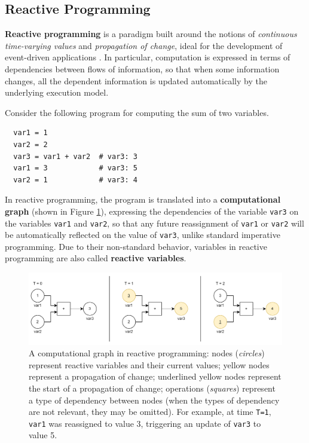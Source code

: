 
\subsection{Reactive Programming}
\label{section:background:concepts:reactive-programming}

\textbf{Reactive programming} is a paradigm built around the notions of
\textit{continuous time-varying values} and \textit{propagation of change},
ideal for the development of event-driven applications
\cite{ReactiveProgramming}. In particular, computation is expressed in terms of
dependencies between flows of information, so that when some information
changes, all the dependent information is updated automatically by the
underlying execution model.

Consider the following program for computing the sum of two variables.

\begin{lstlisting}
  var1 = 1
  var2 = 2
  var3 = var1 + var2  # var3: 3
  var1 = 3            # var3: 5
  var2 = 1            # var3: 4
\end{lstlisting}

In reactive programming, the program is translated into a \textbf{computational
graph} (shown in Figure \ref{figure:dependency-graph}), expressing the
dependencies of the variable \texttt{var3} on the variables \texttt{var1} and
\texttt{var2}, so that any future reassignment of \texttt{var1} or
\texttt{var2} will be automatically reflected on the value of \texttt{var3},
unlike standard imperative programming. Due to their non-standard behavior,
variables in reactive programming are also called \textbf{reactive variables}.

\begin{figure}[!ht]
  \centering
  \includegraphics[width=\textwidth]{resources/figures/dependency-graph.png}
  \caption[A computational graph in reactive programming]{
    A computational graph in reactive programming: nodes (\textit{circles})
    represent reactive variables and their current values; yellow nodes
    represent a propagation of change; underlined yellow nodes represent the
    start of a propagation of change; operations (\textit{squares}) represent a
    type of dependency between nodes (when the types of dependency are not
    relevant, they may be omitted). For example, at time \texttt{T=1},
    \texttt{var1} was reassigned to value 3, triggering an update of
    \texttt{var3} to value 5.
  }
  \label{figure:dependency-graph}
\end{figure}

